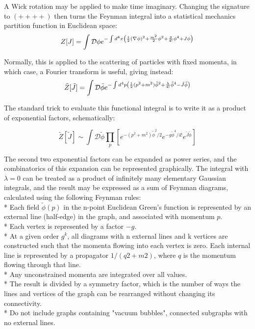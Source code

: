 A Wick rotation may be applied to make time imaginary. Changing the signature to $(++++)$ then turns the Feynman integral into a statistical mechanics partition function in Euclidean space:\\

\begin{equation}
    Z[J]=\int \mathcal{D}\phi e^{-\int d^4x \left({1\over 2}(\nabla\phi)^2+{m^2 \over 2}\phi^2+{g\over 4!}\phi^4+J\phi\right)}
\end{equation}

Normally, this is applied to the scattering of particles with fixed momenta, in which case, a Fourier transform is useful, giving instead:\\

\begin{equation}
    \tilde{Z}[\tilde{J}]=\int \mathcal{D}\tilde\phi e^{-\int d^4p \left({1\over 2}(p^2+m^2)\tilde\phi^2+{\lambda\over 4!}\tilde\phi^4-\tilde{J}\tilde\phi\right)}
\end{equation}

The standard trick to evaluate this functional integral is to write it as a product of exponential factors, schematically:

\begin{equation}
    \tilde{Z}[\tilde{J}]\sim\int \mathcal{D}\tilde\phi \prod_p \left[e^{-(p^2+m^2)\tilde\phi^2/2} e^{-g\tilde\phi^4/4!} e^{\tilde{J}\tilde\phi}\right]
\end{equation}

The second two exponential factors can be expanded as power series, and the combinatorics of this expansion can be represented graphically. The integral with $\lambda = 0$ can be treated as a product of infinitely many elementary Gaussian integrals, and the result may be expressed as a sum of Feynman diagrams, calculated using the following Feynman rules:\\

    * Each field $\tilde{\phi}(p)$ in the n-point Euclidean Green's function is represented by an external line (half-edge) in the graph, and associated with momentum $p$.\\
    * Each vertex is represented by a factor $-g$.\\
    * At a given order $g^k$, all diagrams with n external lines and k vertices are constructed such that the momenta flowing into each vertex is zero. Each internal line is represented by a propagator $1/(q2 + m2)$, where $q$ is the momentum flowing through that line.\\
    * Any unconstrained momenta are integrated over all values.\\
    * The result is divided by a symmetry factor, which is the number of ways the lines and vertices of the graph can be rearranged without changing its connectivity.\\
    * Do not include graphs containing "vacuum bubbles", connected subgraphs with no external lines.\\

